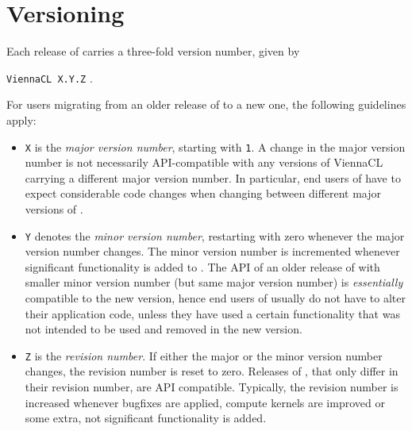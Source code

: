 
\chapter{Versioning}%

Each release of {\ViennaCL} carries a three-fold version number, given by\\
\begin{center}
 \texttt{ViennaCL X.Y.Z} . \\
\end{center}
For users migrating from an older release of {\ViennaCL} to a new one, the
following guidelines apply:
\begin{itemize}
 \item \texttt{X} is the \emph{major version number}, starting with \texttt{1}.
A change in the major version number is not necessarily API-compatible with any
versions of ViennaCL carrying a different major version number. In particular,
end users of {\ViennaCL} have to expect considerable code changes when changing
between different major versions of {\ViennaCL}.

 \item \texttt{Y} denotes the \emph{minor version number}, restarting with zero
whenever the major version number changes. The minor version number is
incremented whenever significant functionality is added to {\ViennaCL}.
The API of an older release of {\ViennaCL} with smaller minor version number
(but same major version number) is \emph{essentially} compatible to the new
version, hence end users of {\ViennaCL} usually do not have to alter their
application code, unless they have used a certain functionality that was not
intended to be used and removed in the new version.

 \item \texttt{Z} is the \emph{revision number}. If either the major or the
minor version number changes, the revision number is reset to zero. Releases of
{\ViennaCL}, that only differ in their revision number, are API compatible.
Typically, the revision number is increased whenever bugfixes are applied,
compute kernels are improved or some extra, not significant functionality is
added.
\end{itemize}

